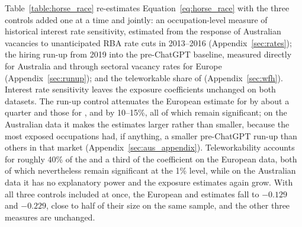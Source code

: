 \documentclass[11pt]{article}
\begin{document}
Table~\ref{table:horse_race} re-estimates Equation~\ref{eq:horse_race} with the three controls added one at a time and jointly: an occupation-level measure of historical interest rate sensitivity, estimated from the response of Australian vacancies to unanticipated RBA rate cuts in 2013--2016 (Appendix~\ref{sec:rates}); the hiring run-up from 2019 into the pre-ChatGPT baseline, measured directly for Australia and through sectoral vacancy rates for Europe (Appendix~\ref{sec:runup}); and the teleworkable share of \citet{dingel2020teleworkable} (Appendix~\ref{sec:wfh}). Interest rate sensitivity leaves the exposure coefficients unchanged on both datasets. The run-up control attenuates the European estimate for \citet{demirev2024assessing} by about a quarter and those for \citet{felten_method_2018}, \citet{eloundou_gpts_2023} and \citet{handa2025economic} by 10--15\%, all of which remain significant; on the Australian data it makes the estimates larger rather than smaller, because the most exposed occupations had, if anything, a smaller pre-ChatGPT run-up than others in that market (Appendix~\ref{sec:aus_appendix}). Teleworkability accounts for roughly 40\% of the \citet{demirev2024assessing} and a third of the \citet{handa2025economic} coefficient on the European data, both of which nevertheless remain significant at the 1\% level, while on the Australian data it has no explanatory power and the exposure estimates again grow. With all three controls included at once, the European \citet{demirev2024assessing} and \citet{handa2025economic} estimates fall to $-0.129$ and $-0.229$, close to half of their size on the same sample, and the other three measures are unchanged.
\end{document}
